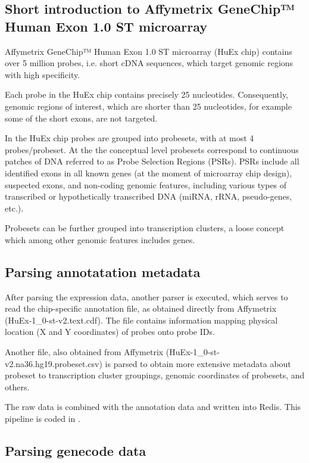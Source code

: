 \subsection{Short introduction to Affymetrix GeneChip™ Human Exon 1.0 ST microarray}

Affymetrix GeneChip™ Human Exon 1.0 ST microarray (HuEx chip) contains over 5 million probes, i.e. short cDNA sequences, which target genomic regions with high specificity.

Each probe in the HuEx chip contains precisely 25 nucleotides. Consequently, genomic regions of interest, which are shorter than 25 nucleotides, for example some of the short exons, are not targeted.

In the HuEx chip probes are grouped into probesets, with at most 4 probes/probeset. At the the conceptual level probesets correspond to continuous patches of DNA referred to as Probe Selection Regions (PSRs). PSRs include all identified exons in all known genes (at the moment of microarray chip design), suspected exons, and non-coding genomic features, including various types of transcribed or hypothetically transcribed DNA (miRNA, rRNA, pseudo-genes, etc.).

Probesets can be further grouped into transcription clusters, a loose concept which among other genomic features includes genes.

\subsection{Parsing annotatation metadata} \label{section_parsingmetadata}

After parsing the expression data, another parser is executed, which serves to read the chip-specific annotation file, as obtained directly from Affymetrix (HuEx-1\_0-st-v2.text.cdf). The file contains information mapping physical location (X and Y coordinates) of probes onto probe IDs.

Another file, also obtained from Affymetrix (HuEx-1\_0-st-v2.na36.hg19.probeset.csv) is parsed to obtain more extensive metadata about probeset to transcription cluster groupings, genomic coordinates of probesets, and others.

The raw data is combined with the annotation data and written into Redis. This pipeline is coded in \cite{ProcessMicroarrays2017}.

\subsection{Parsing genecode data} \label{section_parsinggenecode}

